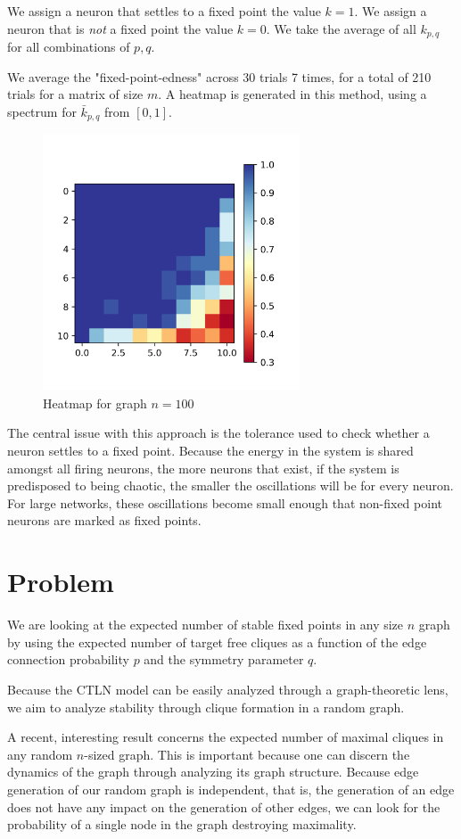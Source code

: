 \documentclass{article}
\theoremstyle{definition}
\theoremstyle{remark}
\begin{document}
We assign a neuron that settles to a fixed point the value $k=1$. We assign a neuron that is \textit{not} a fixed point the value $k=0$. We take the average of all $k_{p,q}$ for all combinations of $p,q$.

We average the "fixed-point-edness" across 30 trials 7 times, for a total of 210 trials for a matrix of size $m$. A heatmap is generated in this method, using a spectrum for $\bar{k}_{p,q}$ from $[0,1]$.

\begin{figure}
    \includegraphics[width=3in]{Matrix Size 100 0.png}
    \caption{Heatmap for graph $n=100$}
\end{figure}

The central issue with this approach is the tolerance used to check whether a neuron settles to a fixed point. Because the energy in the system is shared amongst all firing neurons, the more neurons that exist, if the system is predisposed to being chaotic, the smaller the oscillations will be for every neuron. For large networks, these oscillations become small enough that non-fixed point neurons are marked as fixed points.

\section{Problem}
We are looking at the expected number of stable fixed points in any size $n$ graph by using the expected number of target free cliques as a function of the edge connection probability $p$ and the symmetry parameter $q$.

Because the CTLN model can be easily analyzed through a graph-theoretic lens, we aim to analyze stability through clique formation in a random graph. 

A recent, interesting result concerns the expected number of maximal cliques in any random $n$-sized graph. This is important because one can discern the dynamics of the graph through analyzing its graph structure. Because edge generation of our random graph is independent, that is, the generation of an edge does not have any impact on the generation of other edges, we can look for the probability of a single node in the graph destroying maximality.
\end{document}

